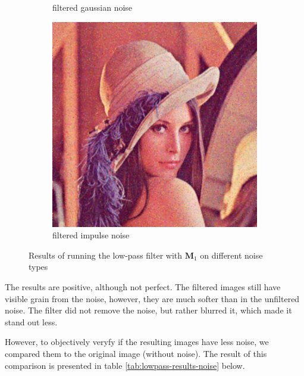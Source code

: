 \documentclass[12pt]{article}
\begin{document}
\begin{figure}[h]
\begin{subfigure}[t]{\subfiguresize}
        \caption{filtered gaussian noise}
    \end{subfigure}
    \begin{subfigure}[t]{\subfiguresize}
        \includegraphics[width=\textwidth]{lenac_lowpass_impulse_1.png}
        \caption{filtered impulse noise}
    \end{subfigure}
    \caption{Results of running the low-pass filter with $\mathbf{M}_1$ on different noise types}
    \label{fig:lowpass-results-noise}
\end{figure}

The results are positive, although not perfect.
The filtered images still have visible grain from the noise, however, they are much softer than in the unfiltered noise.
The filter did not remove the noise, but rather blurred it, which made it stand out less.

However, to objectively veryfy if the resulting images have less noise, we compared them to the original image (without noise).
The result of this comparison is presented in table \ref*{tab:lowpass-results-noise} below.
\end{document}
